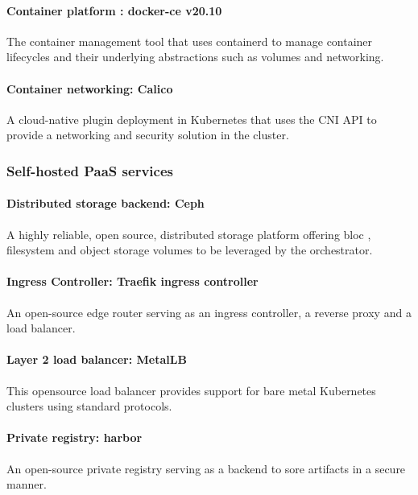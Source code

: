 \paragraph{Container platform : docker-ce v20.10 }

The container management tool that uses containerd to manage container lifecycles and their underlying abstractions such as volumes and networking. 

\paragraph{Container networking: Calico }

A cloud-native plugin deployment in Kubernetes that uses the CNI API to provide a networking and security solution in the cluster. 


\subsubsection{Self-hosted PaaS services }

\paragraph{Distributed storage backend: Ceph }

A highly reliable, open source, distributed storage platform offering bloc , filesystem and object storage volumes to be leveraged by the orchestrator. 

\paragraph{Ingress Controller: Traefik ingress controller }

An open-source edge router serving as an ingress controller, a reverse proxy and a load balancer. 

\paragraph{Layer 2 load balancer: MetalLB }

This opensource load balancer provides support for bare metal Kubernetes clusters using standard protocols. 

\paragraph{Private registry: harbor }

An open-source private registry serving as a backend to sore artifacts in a secure manner. 

